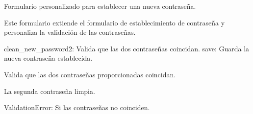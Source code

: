 \documentclass[letterpaper,10pt,spanish]{sphinxmanual}
\begin{document}
\begin{fulllineitems}

\pysigstartsignatures
{}
\pysigstopsignatures
\sphinxAtStartPar
Formulario personalizado para establecer una nueva contraseña.

\sphinxAtStartPar
Este formulario extiende el formulario de establecimiento de contraseña
y personaliza la validación de las contraseñas.
\begin{description}
\sphinxAtStartPar
clean\_new\_password2: Valida que las dos contraseñas coincidan.
save: Guarda la nueva contraseña establecida.

\end{description}


\begin{fulllineitems}

\pysigstartsignatures
{}
\pysigstopsignatures
\end{fulllineitems}



\begin{fulllineitems}

\pysigstartsignatures
{}
\pysigstopsignatures
\sphinxAtStartPar
Valida que las dos contraseñas proporcionadas coincidan.
\begin{description}
\sphinxAtStartPar
La segunda contraseña limpia.

\sphinxAtStartPar
ValidationError: Si las contraseñas no coinciden.

\end{description}

\end{fulllineitems}




\end{fulllineitems}
\end{document}

